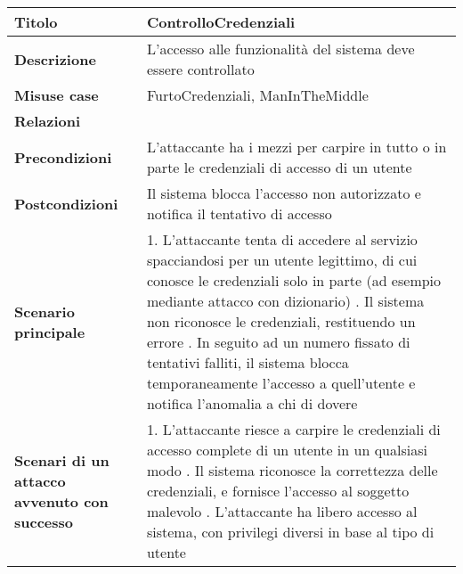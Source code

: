 \begin{tabular} {|P{4cm}|P{13cm}|}
  \hline
  \textbf{Titolo}                                      & ControlloCredenziali                                            \\
  \hline
  \textbf{Descrizione}                                 & L'accesso alle funzionalità del sistema deve essere controllato \\
  \hline
  \textbf{Misuse case}                                 & FurtoCredenziali, ManInTheMiddle                                \\
  \hline
  \textbf{Relazioni}                                   &                                                                 \\
  \hline
  \textbf{Precondizioni}                               & L'attaccante ha i mezzi per carpire in tutto o in
  parte le credenziali di accesso di un utente                                                                           \\
  \hline
  \textbf{Postcondizioni}                              & Il sistema blocca l'accesso non autorizzato e
  notifica il tentativo di accesso                                                                                       \\
  \hline
  \textbf{Scenario principale}                         & 1. L'attaccante tenta di accedere al servizio
  spacciandosi per un utente legittimo, di cui conosce le credenziali solo in
  parte (ad esempio mediante attacco con dizionario) . Il sistema non
  riconosce le credenziali, restituendo un errore . In seguito ad un numero
  fissato di tentativi falliti, il sistema blocca temporaneamente l'accesso a
  quell'utente e notifica l'anomalia a chi di dovere                                                                     \\
  \hline
  \textbf{Scenari di un attacco avvenuto con successo} & 1. L'attaccante riesce
  a carpire le credenziali di accesso complete di un utente in un qualsiasi
  modo . Il sistema riconosce la correttezza delle credenziali, e fornisce
  l'accesso al soggetto malevolo . L'attaccante ha libero accesso al sistema,
  con privilegi diversi in base al tipo di utente                                                                        \\
  \hline
\end{tabular}
\hfill
\break

